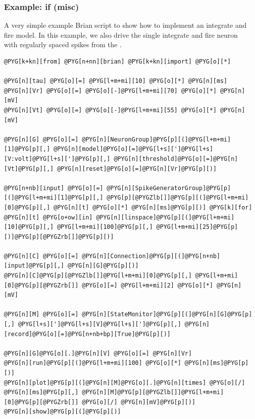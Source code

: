 \documentclass[letterpaper,10pt,english]{manual}
\begin{document}
\hypertarget{index-50}{}\subsubsection{Example: if (misc)}

A very simple example Brian script to show how to implement
an integrate and fire model. In this example, we also
drive the single integrate and fire neuron with
regularly spaced spikes from the \hyperlink{brian.SpikeGeneratorGroup}{}.

\begin{Verbatim}[commandchars=@\[\]]
@PYG[k+kn][from] @PYG[n+nn][brian] @PYG[k+kn][import] @PYG[o][*]

@PYG[n][tau] @PYG[o][=] @PYG[l+m+mi][10] @PYG[o][*] @PYG[n][ms]
@PYG[n][Vr] @PYG[o][=] @PYG[o][-]@PYG[l+m+mi][70] @PYG[o][*] @PYG[n][mV]
@PYG[n][Vt] @PYG[o][=] @PYG[o][-]@PYG[l+m+mi][55] @PYG[o][*] @PYG[n][mV]

@PYG[n][G] @PYG[o][=] @PYG[n][NeuronGroup]@PYG[p][(]@PYG[l+m+mi][1]@PYG[p][,] @PYG[n][model]@PYG[o][=]@PYG[l+s][']@PYG[l+s][V:volt]@PYG[l+s][']@PYG[p][,] @PYG[n][threshold]@PYG[o][=]@PYG[n][Vt]@PYG[p][,] @PYG[n][reset]@PYG[o][=]@PYG[n][Vr]@PYG[p][)]

@PYG[n+nb][input] @PYG[o][=] @PYG[n][SpikeGeneratorGroup]@PYG[p][(]@PYG[l+m+mi][1]@PYG[p][,] @PYG[p][@PYGZlb[]]@PYG[p][(]@PYG[l+m+mi][0]@PYG[p][,] @PYG[n][t] @PYG[o][*] @PYG[n][ms]@PYG[p][)] @PYG[k][for] @PYG[n][t] @PYG[o+ow][in] @PYG[n][linspace]@PYG[p][(]@PYG[l+m+mi][10]@PYG[p][,] @PYG[l+m+mi][100]@PYG[p][,] @PYG[l+m+mi][25]@PYG[p][)]@PYG[p][@PYGZrb[]]@PYG[p][)]

@PYG[n][C] @PYG[o][=] @PYG[n][Connection]@PYG[p][(]@PYG[n+nb][input]@PYG[p][,] @PYG[n][G]@PYG[p][)]
@PYG[n][C]@PYG[p][@PYGZlb[]]@PYG[l+m+mi][0]@PYG[p][,] @PYG[l+m+mi][0]@PYG[p][@PYGZrb[]] @PYG[o][=] @PYG[l+m+mi][2] @PYG[o][*] @PYG[n][mV]

@PYG[n][M] @PYG[o][=] @PYG[n][StateMonitor]@PYG[p][(]@PYG[n][G]@PYG[p][,] @PYG[l+s][']@PYG[l+s][V]@PYG[l+s][']@PYG[p][,] @PYG[n][record]@PYG[o][=]@PYG[n+nb+bp][True]@PYG[p][)]

@PYG[n][G]@PYG[o][.]@PYG[n][V] @PYG[o][=] @PYG[n][Vr]
@PYG[n][run]@PYG[p][(]@PYG[l+m+mi][100] @PYG[o][*] @PYG[n][ms]@PYG[p][)]
@PYG[n][plot]@PYG[p][(]@PYG[n][M]@PYG[o][.]@PYG[n][times] @PYG[o][/] @PYG[n][ms]@PYG[p][,] @PYG[n][M]@PYG[p][@PYGZlb[]]@PYG[l+m+mi][0]@PYG[p][@PYGZrb[]] @PYG[o][/] @PYG[n][mV]@PYG[p][)]
@PYG[n][show]@PYG[p][(]@PYG[p][)]
\end{Verbatim}
\end{document}
